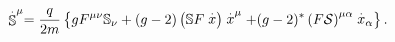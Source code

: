 \begin{equation}
\stackrel{.}{\Bbb{S}}^{\mu }=\frac{q}{2m}\left\{ gF^{\mu \nu }\Bbb{S}_{\nu
}+(g-2)\left( \Bbb{S}F\stackrel{.}{x}\right) \stackrel{.}{x}^{\mu
}+(g-2)^{*}\left( F\mathcal{S}\right) ^{\mu \alpha }\stackrel{.}{x}_{\alpha
}\right\} .
\end{equation}

